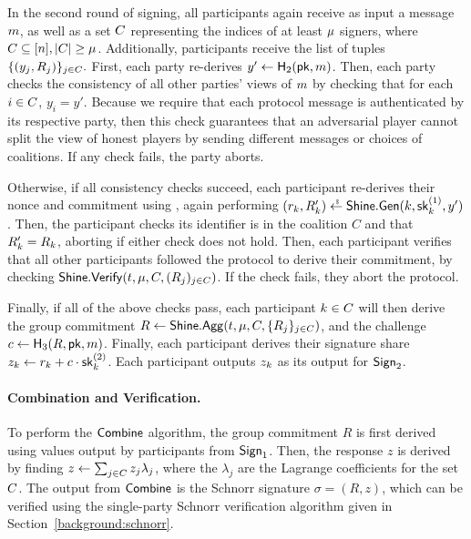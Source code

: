 In the second round of signing,
all participants again receive as input a message $m$,
as well as a set $C$ representing the indices of at least $\mu$ signers,
where $C \subseteq [n], \lvert C \rvert \geq \mu$.
Additionally, participants receive the list of tuples $ \{(y_j, R_j) \}_{j \in C}.$
First,
each party re-derives $y' \gets \mathsf{H}_2(\mathsf{pk}, m)$.
Then,
each party checks the consistency of all other parties' views of $m$
by checking that for each $i \in C$,
$y_i = y'$.
Because we require that each protocol message is authenticated by its respective party,
then this check guarantees that an adversarial player cannot split the view of honest players by sending different messages or choices of coalitions.
If any check fails,
the party aborts.

Otherwise, if all consistency checks succeed,
each participant re-derives their nonce and commitment using \DVRFOne,
again performing
$(r_\partyid, R_\partyid') \rgets \DVRFOnem.\generate(\partyid, \allowbreak \skrand_\partyid, \allowbreak y')$.
Then, the participant checks its identifier is in the coalition $C$ and that $R_k' = R_k$,
aborting if either check does not hold.
Then,
each participant verifies that all other participants followed the protocol to derive  their  commitment,
by checking $\mathsf{Shine}.\mathsf{Verify}(t, \mu, C, (R_j)_{j \in C})$.
If the check fails,
they abort the protocol.

Finally, if all of the above checks pass,
each participant $k \in C$ will then derive the group commitment $R \gets \mathsf{Shine}.\mathsf{Agg}(t, \mu, C, \{ R_j\}_{j \in C})$,
and the challenge $c \gets \mathsf{H}_3(R, \mathsf{pk}, m)$.
Finally,
each participant derives their signature share $z_k \gets r_k + c \cdot \mathsf{sk}^{(2)}_k$.
Each participant outputs $z_k$ as its output for $\mathsf{Sign}_2$.


\paragraph{\bf Combination and Verification.}
To perform the $\mathsf{Combine}$ algorithm,
the group commitment $R$ is first derived using values output by participants from $\mathsf{Sign}_1$.
Then, the response $z$ is derived by finding $z \gets \sum_{j \in C} z_j \lambda_j$, where the $\lambda_j$ are the Lagrange coefficients for the set $C$.
The output from $\mathsf{Combine}$ is the Schnorr signature $\sigma = (R, z)$,
which can be verified using the single-party Schnorr verification algorithm given in Section~\ref{background:schnorr}.


